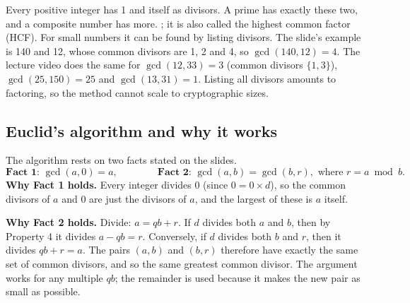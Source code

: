Every positive integer has 1 and itself as divisors. A prime has exactly these two, and a composite number has more. ; it is also called the highest common factor (HCF). For small numbers it can be found by listing divisors. The slide's example is 140 and 12, whose common divisors are 1, 2 and 4, so $\gcd(140, 12) = 4$. The lecture video does the same for $\gcd(12, 33) = 3$ (common divisors $\{1, 3\}$), $\gcd(25, 150) = 25$ and $\gcd(13, 31) = 1$. Listing all divisors amounts to factoring, so the method cannot scale to cryptographic sizes.
\begin{center}
\end{center}

\subsection{Euclid's algorithm and why it works}
The algorithm rests on two facts stated on the slides.
\[
\textbf{Fact 1: } \gcd(a, 0) = a, \qquad\qquad \textbf{Fact 2: } \gcd(a, b) = \gcd(b, r), \text{ where } r = a \bmod b .
\]
\textbf{Why Fact 1 holds.} Every integer divides 0 (since $0 = 0 \times d$), so the common divisors of $a$ and 0 are just the divisors of $a$, and the largest of these is $a$ itself.

\textbf{Why Fact 2 holds.} Divide: $a = qb + r$. If $d$ divides both $a$ and $b$, then by Property 4 it divides $a - qb = r$. Conversely, if $d$ divides both $b$ and $r$, then it divides $qb + r = a$. The pairs $(a, b)$ and $(b, r)$ therefore have exactly the same set of common divisors, and so the same greatest common divisor. The argument works for any multiple $qb$; the remainder is used because it makes the new pair as small as possible.

